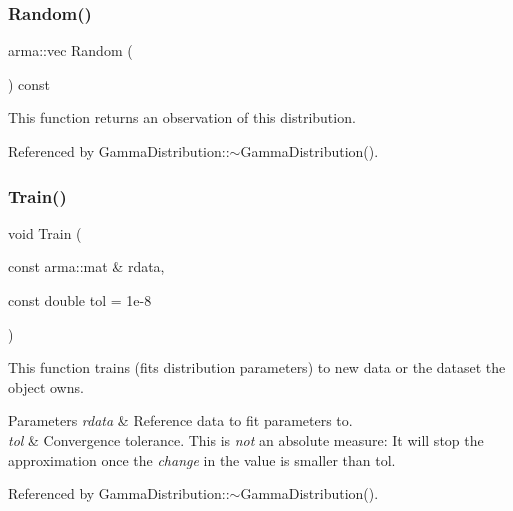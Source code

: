 \subsubsection{Random()}
{\footnotesize\ttfamily arma\+::vec Random (\begin{DoxyParamCaption}{ }\end{DoxyParamCaption}) const}



This function returns an observation of this distribution. 



Referenced by Gamma\+Distribution\+::$\sim$\+Gamma\+Distribution().

\mbox{\label{classmlpack_1_1distribution_1_1GammaDistribution_aa026c530ceb9b6eb76ffe66dcb8d257b}} 
\subsubsection{Train()\hspace{0.1cm}{\footnotesize\ttfamily [1/3]}}
{\footnotesize\ttfamily void Train (\begin{DoxyParamCaption}\item[{const arma\+::mat \&}]{rdata,  }\item[{const double}]{tol = {\ttfamily 1e-\/8} }\end{DoxyParamCaption})}



This function trains (fits distribution parameters) to new data or the dataset the object owns. 


\begin{DoxyParams}{Parameters}
{\em rdata} & Reference data to fit parameters to. \\
\hline
{\em tol} & Convergence tolerance. This is {\itshape not} an absolute measure\+: It will stop the approximation once the {\itshape change} in the value is smaller than tol. \\
\hline
\end{DoxyParams}


Referenced by Gamma\+Distribution\+::$\sim$\+Gamma\+Distribution().

\mbox{\label{classmlpack_1_1distribution_1_1GammaDistribution_a7585f30a098bb6b0ceac0ede43255eba}} 

